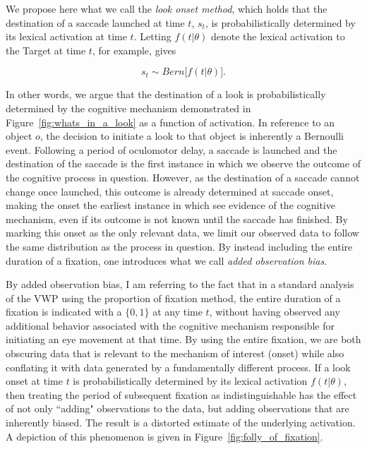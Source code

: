 We propose here what we call the \textit{look onset method}, which holds that the destination of a saccade launched at time $t$, $s_t$, is probabilistically determined by its lexical activation at time $t$. Letting $f(t|\theta)$ denote the lexical activation to the Target at time $t$, for example, gives

\begin{equation}\label{eq:onset_distribution}
s_t \sim Bern \big[ f( t  |  \theta) \big].
\end{equation}

In other words, we argue that the destination of a look is probabilistically determined by the cognitive mechanism demonstrated in Figure~\ref{fig:whats_in_a_look} as a function of activation. In reference to an object $o$, the decision to initiate a look to that object is inherently a Bernoulli event. Following a period of oculomotor delay, a saccade is launched and the destination of the saccade is the first instance in which we observe the outcome of the cognitive process in question. However, as the destination of a saccade cannot change once launched, this outcome is already determined at saccade onset, making the onset the earliest instance in which see evidence of the cognitive mechanism, even if its outcome is not known until the saccade has finished. By marking this onset as the only relevant data, we limit our observed data to follow the same distribution as the process in question. By instead including the entire duration of a fixation, one introduces what we call \textit{added observation bias}.

By added observation bias, I am referring to the fact that in a standard analysis of the VWP using the proportion of fixation method, the entire duration of a fixation is indicated with a $\{0,1\}$ at any time $t$, without having observed any additional behavior associated with the cognitive mechanism responsible for initiating an eye movement at that time. By using the entire fixation, we are both obscuring data that is relevant to the mechanism of interest (onset) while also conflating it with data generated by a fundamentally different process. If a look onset at time $t$ is probabilistically determined by its lexical activation $f(t|\theta)$, then treating the period of subsequent fixation as indistinguishable has the effect of not only ``adding" observations to the data, but adding observations that are inherently biased. The result is a distorted estimate of the underlying activation. A depiction of this phenomenon is given in Figure~\ref{fig:folly_of_fixation}.

